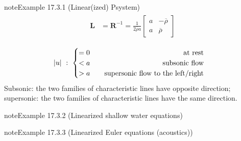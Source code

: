 \documentclass[letterpaper,10pt,english]{jupyterBook}
\begin{document}
\begin{sphinxadmonition}{note}{Example 17.3.1 (Linear(ized) P\sphinxhyphen{}system)}
\begin{equation*}
\begin{split}
\begin{aligned}
  \mathbf{L} & = \mathbf{R}^{-1} = \frac{1}{2 \overline{\rho} a} \begin{bmatrix} a & -\overline{\rho} \\ a & \overline{\rho} \end{bmatrix} \\
\end{aligned}\end{split}
\end{equation*}
\sphinxAtStartPar
{}
\begin{equation*}
\begin{split}|u| \ : \  
\begin{cases}
   = 0 \hfill \qquad \text{at rest} \\
   < a \hfill \qquad \text{subsonic flow} \\
   > a \hfill \qquad \text{supersonic flow to the left/right} \\
\end{cases}
\end{split}
\end{equation*}
\sphinxAtStartPar
Subsonic: the two families of characteristic lines have opposite direction; supersonic: the two families of characteristic lines have the same direction.
\end{sphinxadmonition}
\label{ch/pde/hyperbolic:example-1}
\begin{sphinxadmonition}{note}{Example 17.3.2 (Linearized shallow water equations)}


\end{sphinxadmonition}
\label{ch/pde/hyperbolic:example-2}
\begin{sphinxadmonition}{note}{Example 17.3.3 (Linearized Euler equations (acoustics))}


\end{sphinxadmonition}
\label{ch/pde/hyperbolic:example-3}
\end{document}
